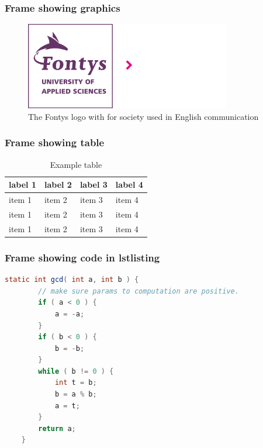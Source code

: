 \documentclass[aspectratio=169]{beamer}
\begin{document}
\begin{frame}
    \frametitle{Frame showing graphics}
    
    \begin{figure}
        \centering
        \includegraphics[width=0.8\textwidth]{logo_purple_society_en.png}
        \caption{The Fontys logo with for society used in English communication}
    \end{figure}

\end{frame}

\begin{frame}
    \frametitle{Frame showing table}

    \begin{table}
        \begin{tabularx}{\textwidth}{ |X|X|X|X| }
            \hline
            label 1 & label 2 & label 3 & label 4 \\
            \hline 
            item 1  & item 2  & item 3  & item 4  \\
            \hline 
            item 1  & item 2  & item 3  & item 4  \\
            \hline 
            item 1  & item 2  & item 3  & item 4  \\
            \hline
          \end{tabularx}
          \caption{Example table}
    \end{table}

\end{frame}

\begin{frame}[containsverbatim]
    \frametitle{Frame showing code in lstlisting}

    \begin{lstlisting}[language=Java, caption={Code example for GCD},captionpos=b]
    static int gcd( int a, int b ) {
        // make sure params to computation are positive.
        if ( a < 0 ) {
            a = -a;
        }
        if ( b < 0 ) {
            b = -b;
        }
        while ( b != 0 ) {
            int t = b;
            b = a % b;
            a = t;
        }
        return a;
    }
    \end{lstlisting}

\end{frame}
\end{document}
